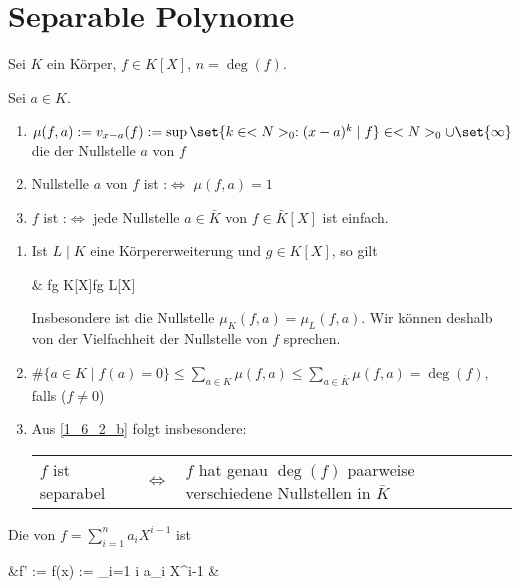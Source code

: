 \section{Separable Polynome}
Sei $K$ ein Körper, $f \in K[X]$, $n = \deg(f)$.
\begin{definition}
	Sei $a \in K$.
	\begin{enumerate}[label={(\arabic*)}]
		\item $\mu(f,a) := v_{x-a}(f) := \sup \set{k \in \N_0 : (x-a)^k \mid f} \in \N_0 \cup \set{\infty}$ die  der Nullstelle $a$ von $f$
		\item Nullstelle $a$ von $f$ ist  :$\Leftrightarrow$ $\mu(f,a) = 1$
		\item $f$ ist  :$\Leftrightarrow$ jede Nullstelle $a\in\bar K$ von $f\in\bar K[X]$ ist einfach.
	\end{enumerate}
\end{definition}
\begin{remark}
	\begin{enumerate}[label={(\alph*)}]
		\item Ist $L\mid K$ eine Körpererweiterung und $g\in K[X]$, so gilt \begin{flalign*}
			\qquad & f\mid g\;\; K[X]\quad\Leftrightarrow\quad f\mid g\;\text{in}\; L[X]
		\end{flalign*}
		Insbesondere ist die Nullstelle $\mu_K(f,a) = \mu_L(f,a)$. Wir können deshalb von der Vielfachheit der Nullstelle von $f$ sprechen.
		\item \label{1_6_2_b} $\displaystyle\#\{a\in K\mid f(a) = 0\} \le \sum_{a\in K} \mu(f,a) \le \sum_{a\in \bar K} \mu(f,a) = \deg(f)$, falls ($f\neq 0$)
		\item Aus \ref{1_6_2_b} folgt insbesondere:\\
		\begin{tabularx}{\linewidth}{XcX}
			\hfill$f$ ist separabel & $\Leftrightarrow$ & $f$ hat genau $\deg(f)$ paarweise verschiedene Nullstellen in $\bar K$
		\end{tabularx}
	\end{enumerate}
\end{remark}
\begin{definition}
	Die  von $f = \sum_{i=1}^n a_i X^{i-1}$ ist \begin{flalign*}
		\qquad &f' :=  f(x) := \sum_{i=1} i a_i X^{i-1} &
	\end{flalign*}
\end{definition}
